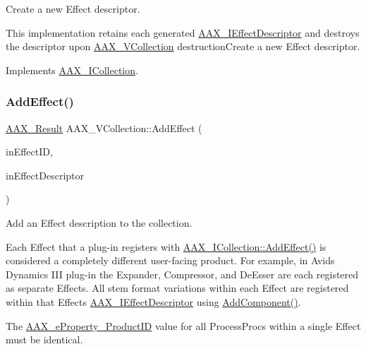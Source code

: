 Create a new Effect descriptor. 

This implementation retains each generated \mbox{\hyperlink{a01813}{A\+A\+X\+\_\+\+I\+Effect\+Descriptor}} and destroys the descriptor upon \mbox{\hyperlink{a01897}{A\+A\+X\+\_\+\+V\+Collection}} destruction\+Create a new Effect descriptor.

Implements \mbox{\hyperlink{a01777_afab70588134a065a5b4d6ea6ddd5ddff}{A\+A\+X\+\_\+\+I\+Collection}}.

\mbox{\label{a01897_a33db3bfe44af490cb86d174d083449fa}} 
\subsubsection{\texorpdfstring{AddEffect()}{AddEffect()}}
{\footnotesize\ttfamily \mbox{\hyperlink{a00392_a4d8f69a697df7f70c3a8e9b8ee130d2f}{A\+A\+X\+\_\+\+Result}} A\+A\+X\+\_\+\+V\+Collection\+::\+Add\+Effect (\begin{DoxyParamCaption}\item[{const char $\ast$}]{in\+Effect\+ID,  }\item[{\mbox{\hyperlink{a01813}{A\+A\+X\+\_\+\+I\+Effect\+Descriptor}} $\ast$}]{in\+Effect\+Descriptor }\end{DoxyParamCaption})\hspace{0.3cm}{\ttfamily [virtual]}}



Add an Effect description to the collection. 

Each Effect that a plug-\/in registers with \mbox{\hyperlink{a01777_a5ff114b8c4da2081515186f2faf65c8c}{A\+A\+X\+\_\+\+I\+Collection\+::\+Add\+Effect()}} is considered a completely different user-\/facing product. For example, in Avid\textquotesingle{}s Dynamics I\+II plug-\/in the Expander, Compressor, and De\+Esser are each registered as separate Effects. All stem format variations within each Effect are registered within that Effect\textquotesingle{}s \mbox{\hyperlink{a01813}{A\+A\+X\+\_\+\+I\+Effect\+Descriptor}} using \mbox{\hyperlink{a01813_aec33938f50461dd5e7c1dcc25faf6917}{Add\+Component()}}.

The \mbox{\hyperlink{a00662_a13e384f22825afd3db6d68395b79ce0da3a41fcdff5af1a4fd19dcbca7b1ba6f3}{A\+A\+X\+\_\+e\+Property\+\_\+\+Product\+ID}} value for all Process\+Procs within a single Effect must be identical.

